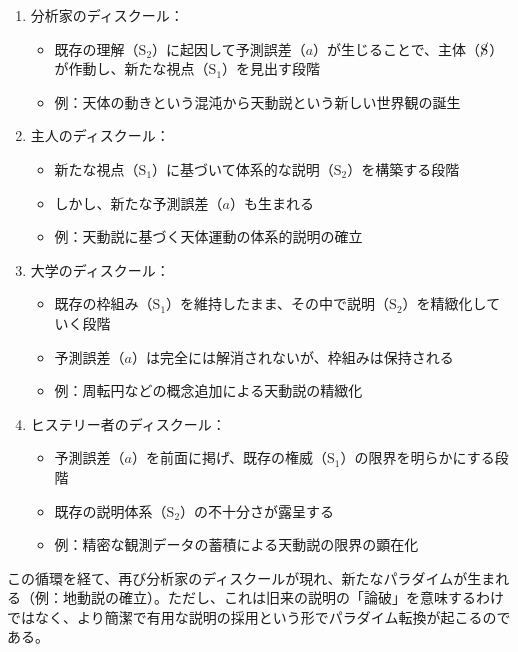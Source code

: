 \begin{enumerate}
\def\labelenumi{\arabic{enumi}.}
\tightlist
\item
  \mbox{分析家のディスクール}：

  \begin{itemize}
  \tightlist
  \item
    既存の理解（\(\textrm{S}_2\)）に起因して\mbox{予測誤差}（\(a\)）が生じることで、主体（\(\cancel{\textrm{S}}\)）が作動し、新たな視点（\(\textrm{S}_1\)）を見出す段階
  \item
    例：天体の動きという混沌から天動説という新しい世界観の誕生
  \end{itemize}
\item
  \mbox{主人のディスクール}：

  \begin{itemize}
  \tightlist
  \item
    新たな視点（\(\textrm{S}_1\)）に基づいて体系的な説明（\(\textrm{S}_2\)）を構築する段階
  \item
    しかし、新たな\mbox{予測誤差}（\(a\)）も生まれる
  \item
    例：天動説に基づく天体運動の体系的説明の確立
  \end{itemize}
\item
  \mbox{大学のディスクール}：

  \begin{itemize}
  \tightlist
  \item
    既存の枠組み（\(\textrm{S}_1\)）を維持したまま、その中で説明（\(\textrm{S}_2\)）を精緻化していく段階
  \item
    \mbox{予測誤差}（\(a\)）は完全には解消されないが、枠組みは保持される
  \item
    例：周転円などの概念追加による天動説の精緻化
  \end{itemize}
\item
  \mbox{ヒステリー者のディスクール}：

  \begin{itemize}
  \tightlist
  \item
    \mbox{予測誤差}（\(a\)）を前面に掲げ、既存の権威（\(\textrm{S}_1\)）の限界を明らかにする段階
  \item
    既存の説明体系（\(\textrm{S}_2\)）の不十分さが露呈する
  \item
    例：精密な観測データの蓄積による天動説の限界の顕在化
  \end{itemize}
\end{enumerate}

この循環を経て、再び\mbox{分析家のディスクール}が現れ、新たなパラダイムが生まれる（例：地動説の確立）。ただし、これは旧来の説明の「論破」を意味するわけではなく、より簡潔で有用な説明の採用という形でパラダイム転換が起こるのである。
